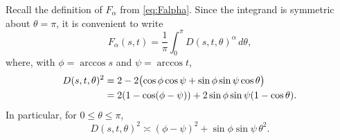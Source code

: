 \documentclass[11pt]{amsart}
\begin{document}
Recall the definition of $F_\alpha$ from \eqref{eq:Falpha}. Since the integrand is symmetric about $\theta=\pi$, it is convenient to
write
\begin{equation}\label{eq:F-polar-average}
 F_\alpha(s,t)=\frac1\pi\int_0^\pi D(s,t,\theta)^\alpha\,d\theta,
\end{equation}
where, with $\phi=\arccos s$ and $\psi=\arccos t$,
\begin{align}
 D(s,t,\theta)^2
 &=2-2\bigl(\cos\phi\cos\psi+
              \sin\phi\sin\psi\cos\theta\bigr)\notag\\
 &=2(1-\cos(\phi-\psi))
   +2\sin\phi\sin\psi(1-\cos\theta).              %
\end{align}
In particular, for $0\le\theta\le\pi$,
\begin{equation}\label{eq:distance-comparison}
 D(s,t,\theta)^2
 \asymp (\phi-\psi)^2+
          \sin\phi\sin\psi\,\theta^2.              %
\end{equation}
\end{document}
